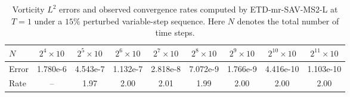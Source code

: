 \begin{table}[htbp]
\centering
\caption{Vorticity $L^2$ errors and observed convergence rates computed by ETD-mr-SAV-MS2-L at $T=1$ under a $15\%$ perturbed variable-step sequence. Here $N$ denotes the total number of time steps.}
\label{tab:variable-step-etd-mrsav-ms2-l}
\begin{tabular}{@{} l *{8}{c} @{}}
\toprule
$N$ & $2^{4}\times 10$ & $2^{5}\times 10$ & $2^{6}\times 10$ & $2^{7}\times 10$ & $2^{8}\times 10$ & $2^{9}\times 10$ & $2^{10}\times 10$ & $2^{11}\times 10$ \\
\midrule
Error & 1.780e-6 & 4.543e-7 & 1.132e-7 & 2.818e-8 & 7.072e-9 & 1.766e-9 & 4.416e-10 & 1.103e-10 \\
Rate & -- & 1.97 & 2.00 & 2.01 & 1.99 & 2.00 & 2.00 & 2.00 \\
\bottomrule
\end{tabular}
\end{table}
